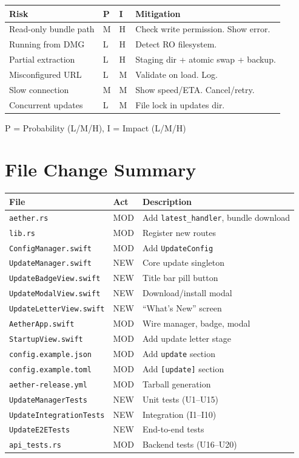 \documentclass[11pt, a4paper]{article}
\begin{document}
\begin{tabularx}{\columnwidth}{lllX}
\toprule
\textbf{Risk} & \textbf{P} & \textbf{I} & \textbf{Mitigation} \\
\midrule
Read-only bundle path & M & H & Check write permission. Show error. \\
Running from DMG & L & H & Detect RO filesystem. \\
Partial extraction & L & H & Staging dir + atomic swap + backup. \\
Misconfigured URL & L & M & Validate on load. Log. \\
Slow connection & M & M & Show speed/ETA. Cancel/retry. \\
Concurrent updates & L & M & File lock in updates dir. \\
\bottomrule
\end{tabularx}

\small{P = Probability (L/M/H), I = Impact (L/M/H)}


\section{File Change Summary}
\label{sec:files}

\begin{tabularx}{\columnwidth}{llX}
\toprule
\textbf{File} & \textbf{Act} & \textbf{Description} \\
\midrule
\texttt{aether.rs} & MOD & Add \texttt{latest\_handler}, bundle download \\
\texttt{lib.rs} & MOD & Register new routes \\
\texttt{ConfigManager.swift} & MOD & Add \texttt{UpdateConfig} \\
\texttt{UpdateManager.swift} & NEW & Core update singleton \\
\texttt{UpdateBadgeView.swift} & NEW & Title bar pill button \\
\texttt{UpdateModalView.swift} & NEW & Download/install modal \\
\texttt{UpdateLetterView.swift} & NEW & ``What's New'' screen \\
\texttt{AetherApp.swift} & MOD & Wire manager, badge, modal \\
\texttt{StartupView.swift} & MOD & Add update letter stage \\
\texttt{config.example.json} & MOD & Add \texttt{update} section \\
\texttt{config.example.toml} & MOD & Add \texttt{[update]} section \\
\texttt{aether-release.yml} & MOD & Tarball generation \\
\texttt{UpdateManagerTests} & NEW & Unit tests (U1--U15) \\
\texttt{UpdateIntegrationTests} & NEW & Integration (I1--I10) \\
\texttt{UpdateE2ETests} & NEW & End-to-end tests \\
\texttt{api\_tests.rs} & MOD & Backend tests (U16--U20) \\
\bottomrule
\end{tabularx}
\end{document}
